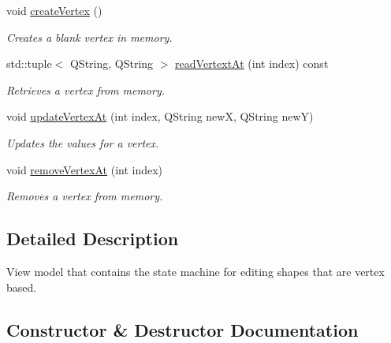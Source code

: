\begin{DoxyCompactItemize}
void \mbox{\hyperlink{class_v_m_editor_vertices_a990cf169787aa12ee32aebde378b99f8}{create\+Vertex}} ()
\begin{DoxyCompactList}\small\item\em Creates a blank vertex in memory. \end{DoxyCompactList}\item 
std\+::tuple$<$ Q\+String, Q\+String $>$ \mbox{\hyperlink{class_v_m_editor_vertices_a3629c7c6ec4cdc153bc12bed2f1504e8}{read\+Vertext\+At}} (int index) const
\begin{DoxyCompactList}\small\item\em Retrieves a vertex from memory. \end{DoxyCompactList}\item 
void \mbox{\hyperlink{class_v_m_editor_vertices_addd6dff8c7d5a7d582d9b6cb4f677843}{update\+Vertex\+At}} (int index, Q\+String newX, Q\+String newY)
\begin{DoxyCompactList}\small\item\em Updates the values for a vertex. \end{DoxyCompactList}\item 
void \mbox{\hyperlink{class_v_m_editor_vertices_a5f1f8f3172ff525863df9bd619d57001}{remove\+Vertex\+At}} (int index)
\begin{DoxyCompactList}\small\item\em Removes a vertex from memory. \end{DoxyCompactList}\end{DoxyCompactItemize}


\subsection{Detailed Description}
View model that contains the state machine for editing shapes that are vertex based. 



\subsection{Constructor \& Destructor Documentation}
\mbox{\label{class_v_m_editor_vertices_ace292193ea7f4a08d79c590a17384c57}} 
